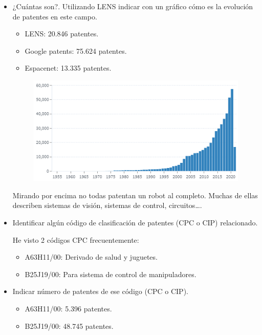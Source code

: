 \begin{itemize}
    \item ¿Cuántas son?. Utilizando LENS indicar con un gráfico cómo es la evolución de patentes en este campo.
    
    \begin{itemize}
        \item LENS: 20.846 patentes.
        \item Google patents: 75.624 patentes.
        \item Espacenet: 13.335 patentes.
    \end{itemize}
    
    \begin{figure}[H]
        \centering
        \includegraphics[width=.8\textwidth]{img/patentes/2a.png}
    \end{figure}

    Mirando por encima no todas patentan un robot al completo. Muchas de ellas describen sistemas de visión, sistemas de control, circuitos\dots.

    \item Identificar algún código de clasificación de patentes (CPC o CIP) relacionado.
    
    He visto 2 códigos CPC frecuentemente:
    \begin{itemize}
        \item A63H11/00: Derivado de salud y juguetes.
        \item B25J19/00: Para sistema de control de manipuladores.
    \end{itemize}

    \item Indicar número de patentes de ese código (CPC o CIP).
    \begin{itemize}
        \item A63H11/00: 5.396 patentes.
        \item B25J19/00: 48.745 patentes.
    \end{itemize}


\end{itemize}
